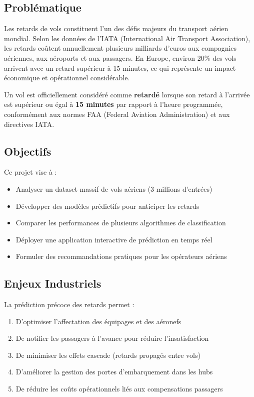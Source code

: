 \documentclass[12pt,a4paper]{article}
\begin{document}
\subsection{Problématique}

Les retards de vols constituent l'un des défis majeurs du transport aérien mondial.
Selon les données de l'IATA (International Air Transport Association), les retards 
coûtent annuellement plusieurs milliards d'euros aux compagnies aériennes, aux 
aéroports et aux passagers. En Europe, environ 20\% des vols arrivent avec un retard 
supérieur à 15 minutes, ce qui représente un impact économique et opérationnel considérable.

\begin{infobox}
  Un vol est officiellement considéré comme \textbf{retardé} lorsque son retard 
  à l'arrivée est supérieur ou égal à \textbf{15 minutes} par rapport à l'heure 
  programmée, conformément aux normes FAA (Federal Aviation Administration) et 
  aux directives IATA.
\end{infobox}

\subsection{Objectifs}

Ce projet vise à :
\begin{itemize}[leftmargin=*]
  \item Analyser un dataset massif de vols aériens (3 millions d'entrées)
  \item Développer des modèles prédictifs pour anticiper les retards
  \item Comparer les performances de plusieurs algorithmes de classification
  \item Déployer une application interactive de prédiction en temps réel
  \item Formuler des recommandations pratiques pour les opérateurs aériens
\end{itemize}

\subsection{Enjeux Industriels}

La prédiction précoce des retards permet :
\begin{enumerate}[leftmargin=*]
  \item D'optimiser l'affectation des équipages et des aéronefs
  \item De notifier les passagers à l'avance pour réduire l'insatisfaction
  \item De minimiser les effets cascade (retards propagés entre vols)
  \item D'améliorer la gestion des portes d'embarquement dans les hubs
  \item De réduire les coûts opérationnels liés aux compensations passagers
\end{enumerate}
\end{document}

